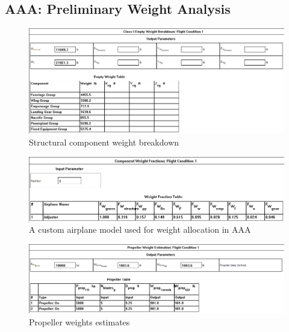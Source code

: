 \documentclass[conf]{new-aiaa}
\begin{document}
\subsection{AAA: Preliminary Weight Analysis}
\begin{figure}[H]
    \includegraphics[width=\textwidth]{Report3Printouts/Weight/ComponentWeights_cropped.png}
    \caption{Structural component weight breakdown}
    \label{fig:componentweights}
\end{figure}

\begin{figure}[H]
    \includegraphics[width=\textwidth]{Report3Printouts/Weight/CustomAirplane_cropped.png}
    \caption{A custom airplane model used for weight allocation in AAA}
    \label{fig:customairplane}
\end{figure}

\begin{figure}[H]
    \includegraphics[width=\textwidth]{Report3Printouts/Weight/PropellerWeight_cropped.png}
    \caption{Propeller weights estimates}
    \label{fig:propellerweight}
\end{figure}
\end{document}
